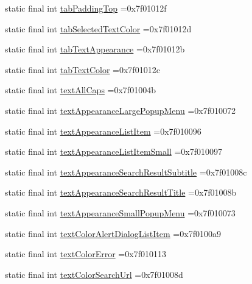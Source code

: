 \begin{DoxyCompactItemize}
\item 
static final int \hyperlink{classproject4_1_1xaria_1_1R_1_1attr_ae8e184d46ffdbd6b10529cb6e73272f1}{tab\+Padding\+Top} =0x7f01012f
\item 
static final int \hyperlink{classproject4_1_1xaria_1_1R_1_1attr_a3136fb05e31f14d3a1664eaa7ff355b1}{tab\+Selected\+Text\+Color} =0x7f01012d
\item 
static final int \hyperlink{classproject4_1_1xaria_1_1R_1_1attr_a9bf69fa8a1e6aca25653efea0178b3ef}{tab\+Text\+Appearance} =0x7f01012b
\item 
static final int \hyperlink{classproject4_1_1xaria_1_1R_1_1attr_a0ac7d6c65606e809217e5f2058477ed5}{tab\+Text\+Color} =0x7f01012c
\item 
static final int \hyperlink{classproject4_1_1xaria_1_1R_1_1attr_a62998ba8d69bd8fda88528b4c2235325}{text\+All\+Caps} =0x7f01004b
\item 
static final int \hyperlink{classproject4_1_1xaria_1_1R_1_1attr_ad8c07b79b8eef25e90fa8698f28917cb}{text\+Appearance\+Large\+Popup\+Menu} =0x7f010072
\item 
static final int \hyperlink{classproject4_1_1xaria_1_1R_1_1attr_a6e03533602c64546d87ed669733fbb32}{text\+Appearance\+List\+Item} =0x7f010096
\item 
static final int \hyperlink{classproject4_1_1xaria_1_1R_1_1attr_a519eecd1eca641d59774d66cfdbdc174}{text\+Appearance\+List\+Item\+Small} =0x7f010097
\item 
static final int \hyperlink{classproject4_1_1xaria_1_1R_1_1attr_a208b343559a51b1bb02db5718f6ab31d}{text\+Appearance\+Search\+Result\+Subtitle} =0x7f01008c
\item 
static final int \hyperlink{classproject4_1_1xaria_1_1R_1_1attr_ac9f1e943ab31ca81504612761ea2ee1f}{text\+Appearance\+Search\+Result\+Title} =0x7f01008b
\item 
static final int \hyperlink{classproject4_1_1xaria_1_1R_1_1attr_aa3b8af07d8b68482a1b809016da6a646}{text\+Appearance\+Small\+Popup\+Menu} =0x7f010073
\item 
static final int \hyperlink{classproject4_1_1xaria_1_1R_1_1attr_ac5fb1c686fef06ad9f36944ff64f0f99}{text\+Color\+Alert\+Dialog\+List\+Item} =0x7f0100a9
\item 
static final int \hyperlink{classproject4_1_1xaria_1_1R_1_1attr_aa6347fcc9a0a66441093bf4b109a507f}{text\+Color\+Error} =0x7f010113
\item 
static final int \hyperlink{classproject4_1_1xaria_1_1R_1_1attr_aafc8d313efe2f31bd9ec158c52b42411}{text\+Color\+Search\+Url} =0x7f01008d

\end{DoxyCompactItemize}
